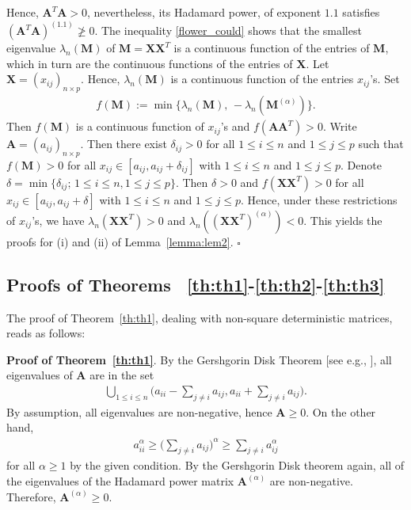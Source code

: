 \documentclass[conference,letterpaper]{IEEEtran}
\numberwithin{equation}{section}
\newcommand{\lbl}{\label}
\newcommand{\beaa}{\begin{eqnarray*}}
\newcommand{\eeaa}{\end{eqnarray*}}
\newcommand{\bea}{\begin{eqnarray}}
\newcommand{\eea}{\end{eqnarray}}
\begin{document}
Hence, $\mathbf{A}^T\mathbf{A}>0$, nevertheless, its Hadamard power, of exponent $1.1$ satisfies $(\mathbf{A}^T\mathbf{A})^{(1.1)} \ngeqslant 0$.
The inequality \eqref{flower_could} shows that the smallest eigenvalue $\lambda_n(\mathbf{M})$ of $\mathbf{M}=\mathbf{X}\mathbf{X}^T$ is a continuous function of the entries of $\mathbf{M}$, which in turn are the continuous functions of the entries of $\mathbf{X}$. 
Let $\mathbf{X}=(x_{ij})_{n\times p}$.
Hence, $\lambda_n(\mathbf{M})$ is a continuous function of the entries $x_{ij}$'s. 
Set
 \beaa
f(\mathbf{M}):=\min\big\{\lambda_n(\mathbf{M}),\, -\lambda_n(\mathbf{M}^{(\alpha)})\big\}.
\eeaa
Then $f(\mathbf{M})$ is a continuous function of $x_{ij}$'s and $f(\mathbf{A}\mathbf{A}^T)>0.$ Write  $\mathbf{A}=(a_{ij})_{n\times p}$. Then there exist $\delta_{ij}>0$ for all $1\leq i\leq n$ and $1\leq j \leq p$ such that $f(\mathbf{M})>0$ for all $x_{ij}\in [a_{ij}, a_{ij}+\delta_{ij}]$ with $1\leq i\leq n$ and $1\leq j \leq p$. Denote $\delta=\min\{\delta_{ij};\, 1\leq i\leq n, 1\leq j \leq p\}.$ Then $\delta>0$ and $f(\mathbf{X}\mathbf{X}^T)>0$ for all $x_{ij}\in [a_{ij}, a_{ij}+\delta]$ with $1\leq i\leq n$ and $1\leq j \leq p$. Hence, under these restrictions of $x_{ij}$'s, we have $\lambda_n(\mathbf{X}\mathbf{X}^T)>0$ and $\lambda_n((\mathbf{X}\mathbf{X}^T)^{(\alpha)}) < 0$. This yields the proofs for (i) and (ii) of Lemma~\ref{lemma:lem2}. \hfill$\square$

\medskip


\subsection{Proofs of Theorems ~\ref{th:th1}-\ref{th:th2}-\ref{th:th3}}
The proof of Theorem~\ref{th:th1}, dealing with non-square deterministic matrices, reads as follows:

\noindent\textbf{Proof of Theorem~\ref{th:th1}}. 
By the Gershgorin Disk Theorem [see e.g., \cite{horn1985}], all eigenvalues of $\mathbf{A}$ are in the set
\bea\lbl{bro_pro}
\bigcup_{1\leq i \leq n}\Big(a_{ii}- \sum_{j\ne i}a_{ij}, a_{ii}+ \sum_{j\ne i}a_{ij}\Big).
\eea
By assumption, all eigenvalues are non-negative, hence $\mathbf{A}\geq 0$. On the other hand,
\beaa
a_{ii}^{\alpha}\geq  \Big(\sum_{j\ne i}a_{ij}\Big)^{\alpha}\geq \sum_{j\ne i}a_{ij}^{\alpha}
\eeaa
for all $\alpha\geq 1$ by the given condition. By the Gershgorin Disk theorem again, all of the eigenvalues of the Hadamard power matrix $\mathbf{A}^{(\alpha)}$ are non-negative. Therefore,  $\mathbf{A}^{(\alpha)}\geq  0$.
\end{document}
